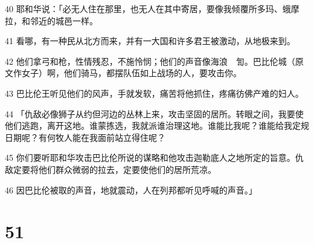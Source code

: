 \par 40 耶和华说：「必无人住在那里，也无人在其中寄居，要像我倾覆所多玛、蛾摩拉，和邻近的城邑一样。
\par 41 看哪，有一种民从北方而来，并有一大国和许多君王被激动，从地极来到。
\par 42 他们拿弓和枪，性情残忍，不施怜悯；他们的声音像海浪　訇。巴比伦城（原文作女子）啊，他们骑马，都摆队伍如上战场的人，要攻击你。
\par 43 巴比伦王听见他们的风声，手就发软，痛苦将他抓住，疼痛彷佛产难的妇人。
\par 44 「仇敌必像狮子从约但河边的丛林上来，攻击坚固的居所。转眼之间，我要使他们逃跑，离开这地。谁蒙拣选，我就派谁治理这地。谁能比我呢？谁能给我定规日期呢？有何牧人能在我面前站立得住呢？
\par 45 你们要听耶和华攻击巴比伦所说的谋略和他攻击迦勒底人之地所定的旨意。仇敌定要将他们群众微弱的拉去，定要使他们的居所荒凉。
\par 46 因巴比伦被取的声音，地就震动，人在列邦都听见呼喊的声音。」

\chapter{51}

